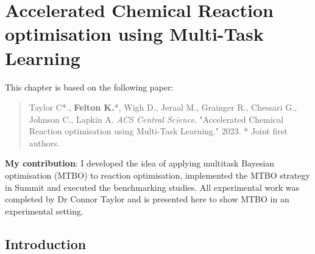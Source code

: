 \chapter{Accelerated Chemical Reaction optimisation using Multi-Task Learning}\label{ch:mtbo} 
This chapter is based on the following paper:

\begin{quote}
    Taylor C*., \textbf{Felton K.}*, Wigh D., Jeraal M., Grainger R., Chessari G., Johnson C., Lapkin A. \textit{ACS Central Science}. "Accelerated Chemical Reaction optimisation using Multi-Task Learning." 2023.
    * Joint first authors.
\end{quote}
\textbf{My contribution}: I developed  the idea of applying multitask Bayesian optimisation (MTBO) to reaction optimisation, implemented the MTBO strategy in Summit and executed the benchmarking studies. All experimental work was completed by Dr Connor Taylor and is presented here to show MTBO in an experimental setting.

\section{Introduction}


